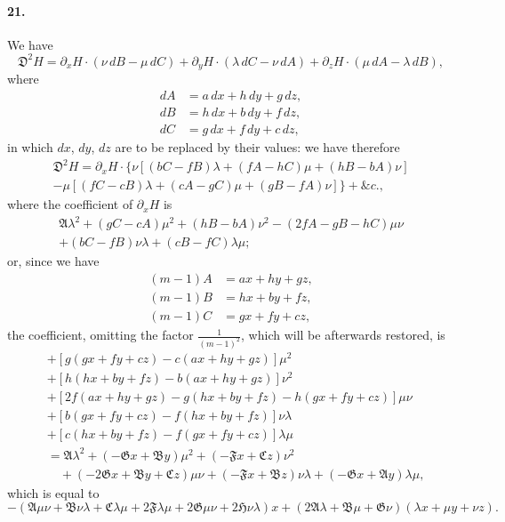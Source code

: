 \documentclass[11pt,a4paper]{book}
\begin{document}
\paragraph{21.}
We   have
\[
\mathfrak{D}^2 H = \partial_x H \cdot (\nu\, dB - \mu\, dC) + \partial_y H \cdot (\lambda\, dC - \nu\, dA) + \partial_z H \cdot (\mu\, dA - \lambda\, dB),
\]
where
\begin{align*}
dA &= a\, dx + h\, dy + g\, dz, \\
dB &= h\, dx + b\, dy + f\, dz, \\
dC &= g\, dx + f\, dy + c\, dz,
\end{align*}
in  which  $dx$,  $dy$,  $dz$  are  to  be  replaced  by  their  values:   we  have  therefore
\begin{multline*}
\mathfrak{D}^2 H = \partial_x H \cdot \{\nu[(bC-fB)\lambda + (fA-hC)\mu + (hB-bA)\nu] \\
- \mu[(fC-cB)\lambda + (cA-gC)\mu + (gB-fA)\nu]\} + \&c.,
\end{multline*}
where  the  coefficient  of  $\partial_x H$  is
\begin{multline*}
\mathfrak{A}\lambda^2 + (gC-cA)\mu^2 + (hB-bA)\nu^2 - (2fA-gB-hC)\mu\nu \\
+ (bC-fB)\nu\lambda + (cB-fC)\lambda\mu;
\end{multline*}
or,  since  we  have
\begin{align*}
(m-1)A &= ax + hy + gz, \\
(m-1)B &= hx + by + fz, \\
(m-1)C &= gx + fy + cz,
\end{align*}
the  coefficient,  omitting  the  factor  $\frac{1}{(m-1)^2}$,  which  will  be  afterwards  restored,  is
\begin{align*}
&+ [g(gx+fy+cz)-c(ax+hy+gz)]\mu^2 \\
&+ [h(hx+by+fz)-b(ax+hy+gz)]\nu^2 \\
&+ [2f(ax+hy+gz)-g(hx+by+fz)-h(gx+fy+cz)]\mu\nu \\
&+ [b(gx+fy+cz)-f(hx+by+fz)]\nu\lambda \\
&+ [c(hx+by+fz)-f(gx+fy+cz)]\lambda\mu \\
&= \mathfrak{A}\lambda^2 + (-\mathfrak{G}x + \mathfrak{B}y)\mu^2 + (-\mathfrak{F}x + \mathfrak{C}z)\nu^2 \\
&\quad + (-2\mathfrak{G}x + \mathfrak{B}y + \mathfrak{C}z)\mu\nu + (-\mathfrak{F}x + \mathfrak{B}z)\nu\lambda + (-\mathfrak{G}x + \mathfrak{A}y)\lambda\mu,
\end{align*}
which  is  equal  to
\[
-(\mathfrak{A}\mu\nu + \mathfrak{B}\nu\lambda + \mathfrak{C}\lambda\mu + 2\mathfrak{F}\lambda\mu + 2\mathfrak{G}\mu\nu + 2\mathfrak{H}\nu\lambda)x
+ (2\mathfrak{A}\lambda + \mathfrak{B}\mu + \mathfrak{G}\nu)(\lambda x + \mu y + \nu z).
\]
\end{document}
